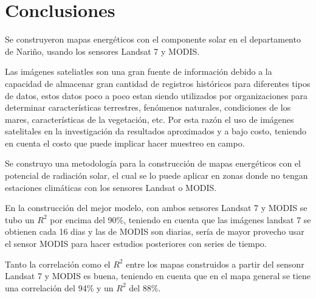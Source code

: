 \section{Conclusiones}

Se construyeron mapas energéticos con el componente solar en el departamento de Nariño,
usando los sensores Landsat 7 y MODIS.

Las imágenes sateliatles son una gran fuente de información debido a la capacidad de almacenar gran cantidad de registros históricos para diferentes tipos de datos, estos datos
poco a poco estan siendo utilizados por organizaciones para determinar características terrestres, fenómenos naturales, condiciones de los mares,
características de la vegetación, etc. Por esta razón el uso de imágenes satelitales
en la investigación da resultados aproximados y a bajo costo, teniendo en cuenta el costo
que puede implicar hacer muestreo en campo.

Se construyo una metodología para la construcción de mapas energéticos con el potencial
de radiación solar, el cual se lo puede aplicar en zonas donde no tengan estaciones climáticas con los sensores Landsat o MODIS.

En la construcción del mejor modelo, con ambos sensores Landsat 7 y MODIS se tubo un $R^2$ por encima del 90\%,
teniendo en cuenta que las imágenes landsat 7 se obtienen cada 16 dias y las de MODIS son diarias, sería
de mayor provecho usar el sensor MODIS para hacer estudios posteriores con series de tiempo.

Tanto la correlación como el $R^2$ entre los mapas construidos a partir del sensonr Landsat 7 y MODIS
es buena, teniendo en cuenta que en el mapa general se tiene una correlación del 94\% y un $R^2$ del
88\%.
